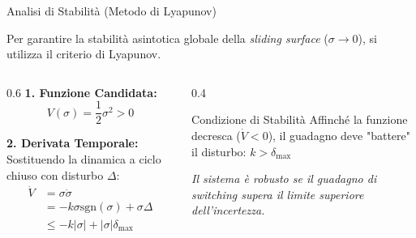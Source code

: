 \documentclass[aspectratio=169]{beamer} %
\begin{document}
\begin{frame}{Analisi di Stabilità (Metodo di Lyapunov)}
    
    Per garantire la stabilità asintotica globale della \textit{sliding surface} ($\sigma \to 0$), si utilizza il criterio di Lyapunov.

    \vspace{0.3cm}
    
    \begin{columns}[T]
        \begin{column}{0.6\textwidth}
            \textbf{1. Funzione Candidata:}
            \begin{equation*}
                V(\sigma) = \frac{1}{2}\sigma^2 > 0
            \end{equation*}
            
            \textbf{2. Derivata Temporale:}
            Sostituendo la dinamica a ciclo chiuso con disturbo $\Delta$:
            \begin{align*}
                \dot{V} &= \sigma \dot{\sigma} \\
                        &= -k \sigma \text{sgn}(\sigma) + \sigma \Delta \\
                        &\le -k |\sigma| + |\sigma| \delta_{\max}
            \end{align*}
        \end{column}
        
        \begin{column}{0.4\textwidth}
            \centering
            \vspace{1cm}
            \begin{alertblock}{Condizione di Stabilità}
                Affinché la funzione decresca ($\dot{V} < 0$), il guadagno deve "battere" il disturbo:
                \vspace{0.2cm}
                \centering
                \large
                \boldmath
                $k > \delta_{\max}$
                \unboldmath
            \end{alertblock}
            
            \vspace{0.3cm}
            \small \itshape
            Il sistema è robusto se il guadagno di switching supera il limite superiore dell'incertezza.
        \end{column}
    \end{columns}

    \vspace{0.5cm}
    \centering

\end{frame}
\end{document}
